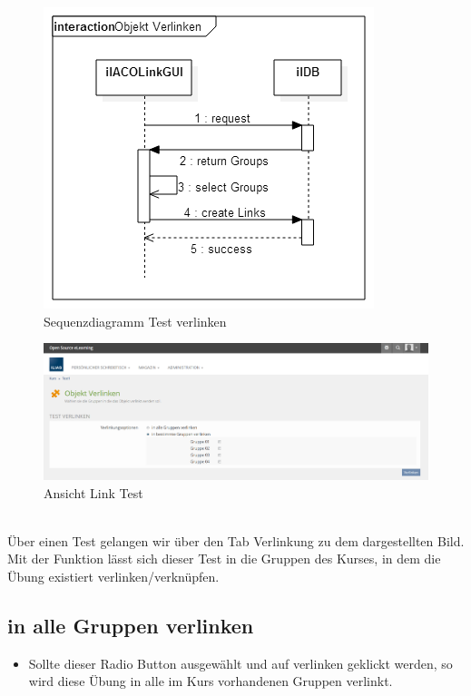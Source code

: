 \begin{figure}[h!]
	\centering
	\includegraphics[width=.7\textwidth]{img/seq_linkGUI.png}
	\caption{Sequenzdiagramm Test verlinken}
\end{figure}
\begin{figure}[h!]
	\centering
	\includegraphics[width=1\textwidth]{img/linkTest.png}
	\caption{Ansicht Link Test}
\end{figure}

~\\Über einen Test gelangen wir über den Tab Verlinkung zu dem dargestellten Bild. 
Mit der Funktion lässt sich dieser Test in die Gruppen des Kurses, in dem die Übung existiert verlinken/verknüpfen. 

\newpage

\subsection*{in alle Gruppen verlinken}
\begin{itemize}
	\item Sollte dieser Radio Button ausgewählt und auf verlinken geklickt werden, so wird diese Übung in alle im Kurs vorhandenen Gruppen verlinkt. 
\end{itemize}

